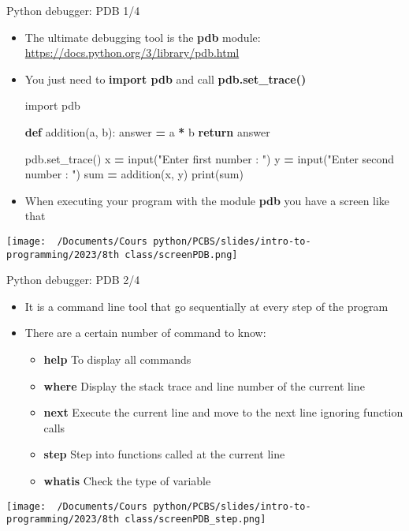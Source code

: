 \documentclass[
  8pt,
  ignorenonframetext,
]{beamer}
\newenvironment{Shaded}{\begin{snugshade}}{\end{snugshade}}
\newcommand{\BuiltInTok}[1]{#1}
\newcommand{\ControlFlowTok}[1]{\textcolor[rgb]{0.13,0.29,0.53}{\textbf{#1}}}
\newcommand{\ImportTok}[1]{#1}
\newcommand{\KeywordTok}[1]{\textcolor[rgb]{0.13,0.29,0.53}{\textbf{#1}}}
\newcommand{\NormalTok}[1]{#1}
\newcommand{\OperatorTok}[1]{\textcolor[rgb]{0.81,0.36,0.00}{\textbf{#1}}}
\newcommand{\StringTok}[1]{\textcolor[rgb]{0.31,0.60,0.02}{#1}}
\providecommand{\tightlist}{%
  \setlength{\itemsep}{0pt}\setlength{\parskip}{0pt}}
\begin{document}
\begin{frame}[fragile]{Python debugger: PDB 1/4}
\protect\hypertarget{python-debugger-pdb-14}{}
\begin{itemize}
\item
  The ultimate debugging tool is the \textbf{pdb} module:
  \url{https://docs.python.org/3/library/pdb.html}
\item
  You just need to \textbf{import pdb} and call
  \textbf{pdb.set\_trace()}

\begin{Shaded}
\begin{Highlighting}[]
\ImportTok{import}\NormalTok{ pdb}

\KeywordTok{def}\NormalTok{ addition(a, b):}
\NormalTok{    answer }\OperatorTok{=}\NormalTok{ a }\OperatorTok{*}\NormalTok{ b}
    \ControlFlowTok{return}\NormalTok{ answer}

\NormalTok{pdb.set\_trace()}
\NormalTok{x }\OperatorTok{=} \BuiltInTok{input}\NormalTok{(}\StringTok{"Enter first number : "}\NormalTok{)}
\NormalTok{y }\OperatorTok{=} \BuiltInTok{input}\NormalTok{(}\StringTok{"Enter second number : "}\NormalTok{)}
\BuiltInTok{sum} \OperatorTok{=}\NormalTok{ addition(x, y)}
\BuiltInTok{print}\NormalTok{(}\BuiltInTok{sum}\NormalTok{)}
\end{Highlighting}
\end{Shaded}
\item
  When executing your program with the module \textbf{pdb} you have a
  screen like that
\end{itemize}

\texttt{[image: ~/Documents/Cours python/PCBS/slides/intro-to-programming/2023/8th class/screenPDB.png]}
\end{frame}

\begin{frame}{Python debugger: PDB 2/4}
\protect\hypertarget{python-debugger-pdb-24}{}
\begin{itemize}
\item
  It is a command line tool that go sequentially at every step of the
  program
\item
  There are a certain number of command to know:

  \begin{itemize}
  \tightlist
  \item
    \textbf{help} To display all commands
  \item
    \textbf{where} Display the stack trace and line number of the
    current line
  \item
    \textbf{next} Execute the current line and move to the next line
    ignoring function calls
  \item
    \textbf{step} Step into functions called at the current line
  \item
    \textbf{whatis} Check the type of variable
  \end{itemize}
\end{itemize}

\texttt{[image: ~/Documents/Cours python/PCBS/slides/intro-to-programming/2023/8th class/screenPDB\_step.png]}
\end{frame}
\end{document}
